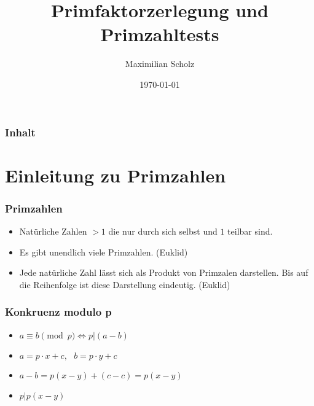 \documentclass[mathserif]{beamer}
\title{Primfaktorzerlegung und Primzahltests}    %
\author{Maximilian Scholz}                 %
\institute{Proseminar Mathematik}      %
\date{\today}                    %
\begin{document}
\begin{frame}
  \titlepage
\end{frame}

\section[]{}

\begin{frame}
  \frametitle{Inhalt}
  \tableofcontents
\end{frame}

\section{Einleitung zu Primzahlen}
  
\begin{frame}
  \frametitle{Primzahlen}
  \begin{itemize}
    \item Nat\"urliche Zahlen $> 1$ die nur durch sich selbst und $1$ teilbar sind.
      \vspace{3mm}
    \item Es gibt unendlich viele Primzahlen. (Euklid)
      \vspace{3mm}
    \item Jede nat\"urliche Zahl l\"asst sich als Produkt von Primzalen darstellen. 
	  Bis auf die Reihenfolge ist diese Darstellung eindeutig. (Euklid)
  \end{itemize}
\end{frame}

\begin{frame}
  \frametitle{Konkruenz modulo p}
  \begin{itemize}
	\item<1->$a \equiv b \pmod p \Leftrightarrow p|(a-b)$
\vspace{3mm}
	\item<2->$a=p\cdot x +c,\ \ \ b= p\cdot y +c$
\vspace{3mm}
	\item<3->$a-b=p(x-y)+(c-c)=p(x-y)$
\vspace{3mm}
	\item<4->$p|p(x-y)$
  \end{itemize}
\end{frame}
\end{document}
